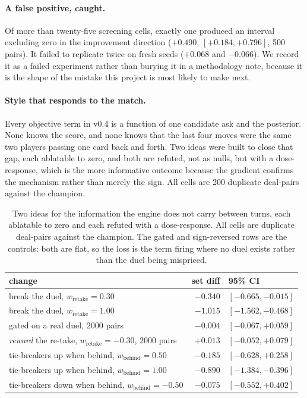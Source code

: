 \documentclass[11pt,letterpaper]{article}
\begin{document}
\paragraph{A false positive, caught.} Of more than twenty-five screening cells,
exactly one produced an interval excluding zero in the improvement direction
($+0.490$, $[+0.184, +0.796]$, 500 pairs). It failed to replicate twice on fresh
seeds ($+0.068$ and $-0.066$). We record it as a failed experiment rather than
burying it in a methodology note, because it is the shape of the mistake this
project is most likely to make next.

\paragraph{Style that responds to the match.} Every objective term in v0.4 is a
function of one candidate ask and the posterior. None knows the score, and none
knows that the last four moves were the same two players passing one card back
and forth. Two ideas were built to close that gap, each ablatable to zero, and
both are refuted, not as nulls, but with a dose-response, which is the more
informative outcome because the gradient confirms the mechanism rather than
merely the sign. All cells are 200 duplicate deal-pairs against the champion.

\begin{table}[t]
\centering
\small
\begin{tabular}{lrl}
\toprule
change & set diff & 95\% CI \\
\midrule
break the duel, $w_{\mathrm{retake}} = 0.30$ & $-0.340$ & $[-0.665, -0.015]$ \\
break the duel, $w_{\mathrm{retake}} = 1.00$ & $\mathbf{-1.015}$ & $[-1.562, -0.468]$ \\
\quad gated on a real duel, $2000$ pairs & $-0.004$ & $[-0.067, +0.059]$ \\
\emph{reward} the re-take, $w_{\mathrm{retake}} = -0.30$, $2000$ pairs & $+0.013$ & $[-0.052, +0.079]$ \\
\midrule
tie-breakers up when behind, $w_{\mathrm{behind}} = 0.50$ & $-0.185$ & $[-0.628, +0.258]$ \\
tie-breakers up when behind, $w_{\mathrm{behind}} = 1.00$ & $\mathbf{-0.890}$ & $[-1.384, -0.396]$ \\
tie-breakers down when behind, $w_{\mathrm{behind}} = -0.50$ & $-0.075$ & $[-0.552, +0.402]$ \\
\bottomrule
\end{tabular}
\caption{Two ideas for the information the engine does not carry between turns, each ablatable to zero and each refuted with a dose-response. All cells are duplicate deal-pairs against the champion. The gated and sign-reversed rows are the controls: both are flat, so the loss is the term firing where no duel exists rather than the duel being mispriced.}
\label{tab:memory}
\end{table}
\end{document}
